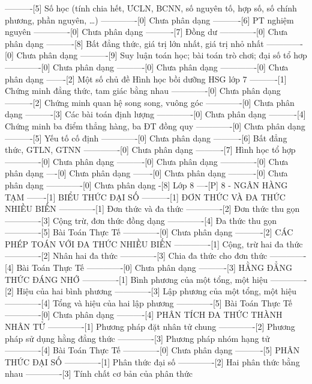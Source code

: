 ----------[5] Số học (tính chia hết, ƯCLN, BCNN, số nguyên tố, hợp số, số chính phương, phần nguyên, \ldots)
-------------[0] Chưa phân dạng
----------[6] PT nghiệm nguyên
-------------[0] Chưa phân dạng
----------[7] Đồng dư
-------------[0] Chưa phân dạng
----------[8] Bất đẳng thức, giá trị lớn nhất, giá trị nhỏ nhất
-------------[0] Chưa phân dạng
----------[9] Suy luận toán học; bài toán trò chơi; đại số tổ hơp
-------------[0] Chưa phân dạng
----------[0] Chưa phân dạng
-------------[0] Chưa phân dạng
-------[2] Một số chủ đề Hình học bồi dưỡng HSG lớp 7
----------[1] Chứng minh đẳng thức, tam giác bằng nhau
-------------[0] Chưa phân dạng
----------[2] Chứng minh quan hệ song song, vuông góc
-------------[0] Chưa phân dạng
----------[3] Các bài toán định lượng
-------------[0] Chưa phân dạng
----------[4] Chứng minh ba điểm thẳng hàng, ba ĐT đồng quy
-------------[0] Chưa phân dạng
----------[5] Yếu tố cố định
-------------[0] Chưa phân dạng
----------[6] Bất đẳng thức, GTLN, GTNN
-------------[0] Chưa phân dạng
----------[7] Hình học tổ hợp
-------------[0] Chưa phân dạng
----------[0] Chưa phân dạng
-------------[0] Chưa phân dạng
----[0] Chưa phân dạng
-------[0] Chưa phân dạng
----------[0] Chưa phân dạng
-------------[0] Chưa phân dạng
-[8] Lớp 8
----[P] 8 - NGÂN HÀNG TẠM
-------[1] BIỂU THỨC ĐẠI SỐ
----------[1] ĐƠN THỨC VÀ ĐA THỨC NHIỀU BIẾN
-------------[1] Đơn thức và đa thức
-------------[2] Đơn thức thu gọn
-------------[3] Cộng trừ, đơn thức đồng dạng
-------------[4] Đa thức thu gọn
-------------[5] Bài Toán Thực Tế
-------------[0] Chưa phân dạng
----------[2] CÁC PHÉP TOÁN VỚI ĐA THỨC NHIỀU BIẾN
-------------[1] Cộng, trừ hai đa thức
-------------[2] Nhân hai đa thức
-------------[3] Chia đa thức cho đơn thức
-------------[4] Bài Toán Thực Tế
-------------[0] Chưa phân dạng
----------[3] HẰNG ĐẲNG THỨC ĐÁNG NHỚ
-------------[1] Bình phương của một tổng, một hiệu
-------------[2] Hiệu của hai bình phương
-------------[3] Lập phương của một tổng, một hiệu
-------------[4] Tổng và hiệu của hai lập phương
-------------[5] Bài Toán Thực Tế
-------------[0] Chưa phân dạng
----------[4] PHÂN TÍCH ĐA THỨC THÀNH NHÂN TỬ
-------------[1] Phương pháp đặt nhân tử chung
-------------[2] Phương pháp sử dụng hằng đẳng thức
-------------[3] Phương pháp nhóm hạng tử
-------------[4] Bài Toán Thực Tế
-------------[0] Chưa phân dạng
----------[5] PHÂN THỨC ĐẠI SỐ
-------------[1] Phân thức đại số
-------------[2] Hai phân thức bằng nhau
-------------[3] Tính chất cơ bản của phân thức
